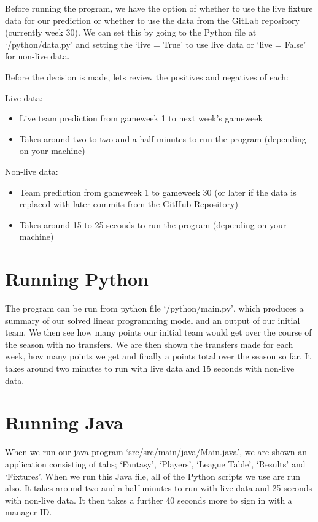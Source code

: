 \documentclass[12pt, a4paper, oneside]{book}
\numberwithin{equation}{section}
\begin{document}
Before running the program, we have the option of whether to use the live fixture data for our prediction or whether to use the data from the GitLab repository (currently week 30). We can set this by going to the Python file  at `/python/data.py' and setting the `live = True' to use live data or `live = False' for non-live data.

Before the decision is made, lets review the positives and negatives of each:

Live data:
\begin{itemize}
  \item Live team prediction from gameweek 1 to next week's gameweek
  \item Takes around two to two and a half minutes to run the program (depending on your machine)
\end{itemize}

Non-live data:
\begin{itemize}
  \item Team prediction from gameweek 1 to gameweek 30 (or later if the data is replaced with later commits from the GitHub Repository)
  \item Takes around 15 to 25 seconds to run the program (depending on your machine)
\end{itemize}

\section{Running Python}\label{sec:7.3}

The program can be run from python file `/python/main.py', which produces a summary of our solved linear programming model and an output of our initial team. We then see how many points our initial team would get over the course of the season with no transfers. We are then shown the transfers made for each week, how many points we get and finally a points total over the season so far. It takes around two minutes to run with live data and 15 seconds with non-live data.

\section{Running Java}\label{sec:7.4}

When we run our java program `src/src/main/java/Main.java', we are shown an application consisting of tabs; `Fantasy', `Players', `League Table', `Results' and `Fixtures'. When we run this Java file, all of the Python scripts we use are run also. It takes around two and a half minutes to run with live data and 25 seconds with non-live data. It then takes a further 40 seconds more to sign in with a manager ID.
\end{document}
